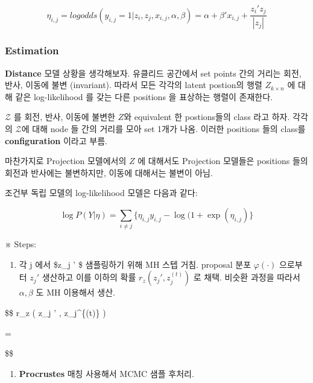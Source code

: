 \documentclass[
]{book}
\providecommand{\tightlist}{%
  \setlength{\itemsep}{0pt}\setlength{\parskip}{0pt}}
\begin{document}
{{{\[
\eta_{i,j} = logodds (y_{i,j} = 1 | z_i , z_j , x_{i,j}, \alpha, \beta) = \alpha + \beta ' x_{i,j} + \frac{z_i' z_j}{| z_j |}
\]

\hypertarget{estimation-2}{%
\subsubsection{Estimation}\label{estimation-2}}

\textbf{Distance} 모델 상황을 생각해보자. 유클리드 공간에서 set points 간의 거리는 회전, 반사, 이동에 불변 (invariant). 따라서 모든 각각의 latent postion의 행렬 \(Z_{k \times n}\) 에 대해 같은 log-likelihood 를 갖는 다른 positions 을 표상하는 행렬이 존재한다.

\(\mathcal Z\) 를 회전, 반사, 이동에 불변한 \(Z\)와 equivalent 한 postions들의 class 라고 하자. 각각의 \(\mathcal Z\)에 대해 node 들 간의 거리를 모아 set 1개가 나옴. 이러한 positions 들의 class를 \textbf{configuration} 이라고 부름.

마찬가지로 Projection 모델에서의 \(Z\) 에 대해서도 Projection 모델들은 positions 들의 회전과 반사에는 불변하지만, 이동에 대해서는 불변이 아님.

조건부 독립 모델의 log-likelihood 모델은 다음과 같다:

\[
\log P(Y | \eta ) = \sum_{i \not = j} \Big \{  \eta_{i,j}y_{i,j} - \log (1+\exp(\eta_{i,j})
\Big \}
\]

※ Steps:

\begin{enumerate}
\def\labelenumi{\arabic{enumi}.}
\tightlist
\item
  각 j 에서 \$z\_j ' \$ 샘플링하기 위해 MH 스텝 거침. proposal 분포 \(\varphi(\cdot)\) 으로부터 \(z_j'\) 생산하고 이를 이하의 확률 \(r_z \left ( z_j ' , z_j^{(t)} \right)\) 로 채택. 비슷환 과정을 따라서 \(\alpha, \beta\) 도 MH 이용해서 생산.
\end{enumerate}

\$\$
r\_z \left ( z\_j ' , z\_j\^{}\{(t)\} \right)

= 


\$\$

\begin{enumerate}
\def\labelenumi{\arabic{enumi}.}
\setcounter{enumi}{1}
\item
  \textbf{Procrustes} 매칭 사용해서 MCMC 샘플 후처리.


\end{enumerate}}}}
\end{document}

